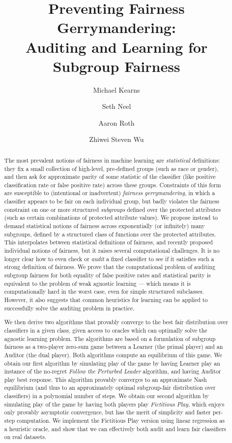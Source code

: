 \documentclass[11pt]{article}
\title{Preventing Fairness Gerrymandering: \\ Auditing and Learning for Subgroup Fairness}
\author[1]{Michael Kearns}
\author[1]{Seth Neel}
\author[1]{Aaron Roth}
\author[2]{Zhiwei Steven Wu}
\affil[1]{University of Pennsylvania}
\affil[2]{Microsoft Research-New York City}
\begin{document}
\maketitle

\begin{abstract}
  The most prevalent notions of fairness in machine learning are
  \emph{statistical} definitions: they fix a small collection of
  high-level, pre-defined groups (such as race or gender), and then
  ask for approximate parity of some statistic of the classifier (like
  positive classification rate or false positive rate) across these
  groups.  Constraints of this form are susceptible to (intentional or
  inadvertent) \emph{fairness gerrymandering}, in which a classifier
  appears to be fair on each individual group, but badly violates the
  fairness constraint on one or more structured \emph{subgroups}
  defined over the protected attributes (such as certain combinations
  of protected attribute values).  We propose instead to demand
  statistical notions of fairness across exponentially (or infinitely)
  many subgroups, defined by a structured class of functions over the
  protected attributes. This interpolates between statistical
  definitions of fairness, and recently proposed individual notions of
  fairness, but it raises several computational challenges. It is no
  longer clear how to even check or \emph{audit} a fixed classifier to
  see if it satisfies such a strong definition of fairness. We prove
  that the computational problem of auditing subgroup fairness for
  both equality of false positive rates and statistical parity is
  equivalent to the problem of weak agnostic learning --- which means
  it is computationally hard in the worst case, even for simple
  structured subclasses. However, it also suggests that common
  heuristics for learning can be applied to successfully solve the
  auditing problem in practice.


We then derive two algorithms that provably converge to the best fair
distribution over classifiers in a given class, given access to
oracles which can optimally solve the agnostic learning problem.  The
algorithms are based on a formulation of subgroup fairness as a
two-player zero-sum game between a Learner (the primal player) and an
Auditor (the dual player). Both algorithms compute an equilibrium of
this game. We obtain our first algorithm by simulating play of the
game by having Learner play an instance of the no-regret {\em Follow
  the Perturbed Leader\/} algorithm, and having Auditor play best
response. This algorithm provably converges to an approximate Nash
equilibrium (and thus to an approximately optimal subgroup-fair
distribution over classifiers) in a polynomial number of steps.  We
obtain our second algorithm by simulating play of the game by having
both players play {\em Fictitious Play\/}, which enjoys only provably
asymptotic convergence, but has the merit of simplicity and faster
per-step computation.  We implement the Fictitious Play version using
linear regression as a heuristic oracle, and show that we can
effectively both audit and learn fair classifiers on real datasets.
\end{abstract}
\end{document}
